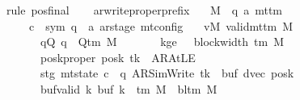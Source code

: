 \begin{isabellebody}
\ {\isacharparenleft}{\kern0pt}rule\ pos{\isacharunderscore}{\kern0pt}final{\isacharparenright}{\kern0pt}\isanewline
\ \ \isamarkupfalse%
\isanewline
{}\isamarkupfalse%
%
\endisatagproof
{\isafoldproof}%
%
\isadelimproof
\isanewline
%
\endisadelimproof
\isanewline
{}\isamarkupfalse%
\ ar{\isacharunderscore}{\kern0pt}write{\isacharunderscore}{\kern0pt}proper{\isacharunderscore}{\kern0pt}prefix{\isacharcolon}{\kern0pt}\isanewline
\ \ \ M\ {\isacharcolon}{\kern0pt}{\isacharcolon}{\kern0pt}\ {\isachardoublequoteopen}{\isacharparenleft}{\kern0pt}{\isacharprime}{\kern0pt}q{\isacharcomma}{\kern0pt}\ {\isacharprime}{\kern0pt}a{\isacharparenright}{\kern0pt}\ mttm{\isachardoublequoteclose}\isanewline
\ \ \ \ \ c{\isacharprime}{\kern0pt}\ {\isacharcolon}{\kern0pt}{\isacharcolon}{\kern0pt}\ {\isachardoublequoteopen}{\isacharparenleft}{\kern0pt}sym{}{\isacharcomma}{\kern0pt}\ {\isacharprime}{\kern0pt}q\ {\isasymtimes}\ {\isacharprime}{\kern0pt}a\ ar{\isacharunderscore}{\kern0pt}stage{\isacharparenright}{\kern0pt}\ mt{\isacharunderscore}{\kern0pt}config{\isachardoublequoteclose}\isanewline
\ \ \ vM{\isacharcolon}{\kern0pt}\ {\isachardoublequoteopen}valid{\isacharunderscore}{\kern0pt}mttm\ M{\isachardoublequoteclose}\isanewline
\ \ \ \ \ \ \ qQ{\isacharcolon}{\kern0pt}\ {\isachardoublequoteopen}q\ {\isasymin}\ Q{\isacharunderscore}{\kern0pt}tm\ M{\isachardoublequoteclose}\isanewline
\ \ \ \ \ \ \ kge{}{\isacharcolon}{\kern0pt}\ {\isachardoublequoteopen}{}\ {\isasymle}\ block{\isacharunderscore}{\kern0pt}width\ {\isacharparenleft}{\kern0pt}{\isasymGamma}{\isacharunderscore}{\kern0pt}tm\ M{\isacharparenright}{\kern0pt}{\isachardoublequoteclose}\isanewline
\ \ \ \ \ \ \ poskproper{\isacharcolon}{\kern0pt}\ {\isachardoublequoteopen}posk\ tk\ {\isasymnoteq}\ AR{\isacharunderscore}{\kern0pt}AtLE{\isachardoublequoteclose}\isanewline
\ \ \ \ \ \ \ stg{\isacharcolon}{\kern0pt}\ {\isachardoublequoteopen}mt{\isacharunderscore}{\kern0pt}state\ c{\isacharprime}{\kern0pt}\ {\isacharequal}{\kern0pt}\ {\isacharparenleft}{\kern0pt}q{\isacharcomma}{\kern0pt}\ AR{\isacharunderscore}{\kern0pt}SimWrite{\isacharcomma}{\kern0pt}\ tk{\isacharcomma}{\kern0pt}\ {}{\isacharcomma}{\kern0pt}\ buf{\isacharcomma}{\kern0pt}\ dvec{\isacharcomma}{\kern0pt}\ posk{\isacharparenright}{\kern0pt}{\isachardoublequoteclose}\isanewline
\ \ \ \ \ \ \ buf{\isacharunderscore}{\kern0pt}valid{\isacharcolon}{\kern0pt}\ {\isachardoublequoteopen}{\isasymforall}k{\isachardot}{\kern0pt}\ buf\ k\ {\isasymin}\ {\isasymGamma}{\isacharunderscore}{\kern0pt}tm\ M\ {\isasymunion}\ {\isacharbraceleft}{\kern0pt}bl{\isacharunderscore}{\kern0pt}tm\ M{\isacharbraceright}{\kern0pt}{\isachardoublequoteclose}\isanewline

\end{isabellebody}
